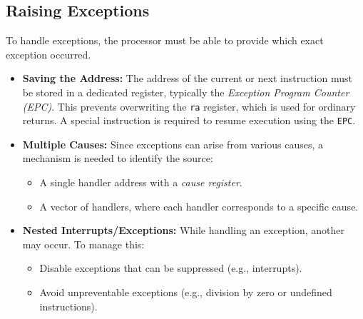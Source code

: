 \subsection{Raising Exceptions}
To handle exceptions, the processor must be able to provide which exact exception occurred.
\begin{itemize}
    \item[] \textbf{Saving the Address:} The address of the current or next instruction must be stored in a dedicated register, typically the \textit{Exception Program Counter (EPC)}. This prevents overwriting the \texttt{ra} register, which is used for ordinary returns. A special instruction is required to resume execution using the \texttt{EPC}.
    \item[] \textbf{Multiple Causes:} Since exceptions can arise from various causes, a mechanism is needed to identify the source:
    \begin{itemize}
        \item A single handler address with a \textit{cause register}.
        \item A vector of handlers, where each handler corresponds to a specific cause.
    \end{itemize}
    \item[] \textbf{Nested Interrupts/Exceptions:} While handling an exception, another may occur. To manage this:
    \begin{itemize}
        \item Disable exceptions that can be suppressed (e.g., interrupts).
        \item Avoid unpreventable exceptions (e.g., division by zero or undefined instructions).
    \end{itemize}
\end{itemize}

